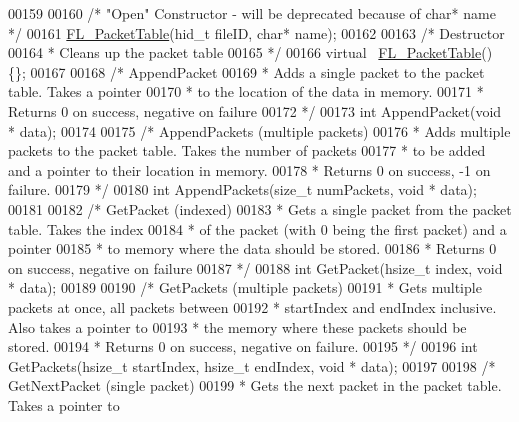 \begin{DoxyCode}
00159 
00160     \textcolor{comment}{/* "Open" Constructor - will be deprecated because of char* name */}
00161     \hyperlink{class_f_l___packet_table}{FL\_PacketTable}(hid\_t fileID, \textcolor{keywordtype}{char}* name);
00162 
00163     \textcolor{comment}{/* Destructor}
00164 \textcolor{comment}{     * Cleans up the packet table}
00165 \textcolor{comment}{     */}
00166     \textcolor{keyword}{virtual} ~\hyperlink{class_f_l___packet_table}{FL\_PacketTable}() \{\};
00167 
00168     \textcolor{comment}{/* AppendPacket}
00169 \textcolor{comment}{     * Adds a single packet to the packet table.  Takes a pointer}
00170 \textcolor{comment}{     * to the location of the data in memory.}
00171 \textcolor{comment}{     * Returns 0 on success, negative on failure}
00172 \textcolor{comment}{     */}
00173     \textcolor{keywordtype}{int} AppendPacket(\textcolor{keywordtype}{void} * data);
00174 
00175     \textcolor{comment}{/* AppendPackets (multiple packets)}
00176 \textcolor{comment}{     * Adds multiple packets to the packet table.  Takes the number of packets}
00177 \textcolor{comment}{     * to be added and a pointer to their location in memory.}
00178 \textcolor{comment}{     * Returns 0 on success, -1 on failure.}
00179 \textcolor{comment}{     */}
00180     \textcolor{keywordtype}{int} AppendPackets(\textcolor{keywordtype}{size\_t} numPackets, \textcolor{keywordtype}{void} * data);
00181 
00182     \textcolor{comment}{/* GetPacket (indexed)}
00183 \textcolor{comment}{     * Gets a single packet from the packet table.  Takes the index}
00184 \textcolor{comment}{     * of the packet (with 0 being the first packet) and a pointer}
00185 \textcolor{comment}{     * to memory where the data should be stored.}
00186 \textcolor{comment}{     * Returns 0 on success, negative on failure}
00187 \textcolor{comment}{     */}
00188     \textcolor{keywordtype}{int} GetPacket(hsize\_t index, \textcolor{keywordtype}{void} * data);
00189 
00190     \textcolor{comment}{/* GetPackets (multiple packets)}
00191 \textcolor{comment}{     * Gets multiple packets at once, all packets between}
00192 \textcolor{comment}{     * startIndex and endIndex inclusive.  Also takes a pointer to}
00193 \textcolor{comment}{     * the memory where these packets should be stored.}
00194 \textcolor{comment}{     * Returns 0 on success, negative on failure.}
00195 \textcolor{comment}{     */}
00196     \textcolor{keywordtype}{int} GetPackets(hsize\_t startIndex, hsize\_t endIndex, \textcolor{keywordtype}{void} * data);
00197 
00198     \textcolor{comment}{/* GetNextPacket (single packet)}
00199 \textcolor{comment}{     * Gets the next packet in the packet table.  Takes a pointer to}

\end{DoxyCode}
